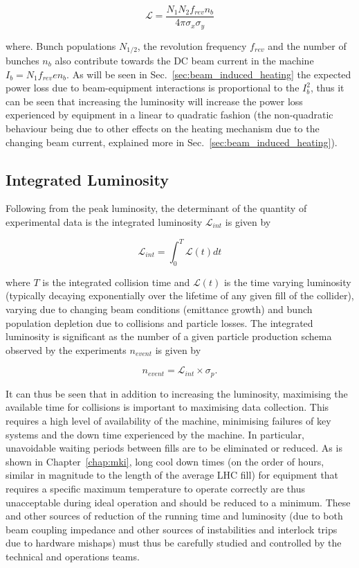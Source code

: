 \begin{equation}
\mathcal{L} = \frac{N_{1} N_{2} f_{rev} n_{b}}{4 \pi \sigma_{x} \sigma_{y}}
\label{eqn:LumiBeamPara}
\end{equation}

where. Bunch populations $N_{1/2}$, the revolution frequency $f_{rev}$ and the number of bunches $n_{b}$ also contribute towards the DC beam current in the machine $I_{b} = N_{1} f_{rev} e n_{b}$. As will be seen in Sec.~\ref{sec:beam_induced_heating} the expected power loss due to beam-equipment interactions is proportional to the $I_{b}^{2}$, thus it can be seen that increasing the luminosity will increase the power loss experienced by equipment in a linear to quadratic fashion (the non-quadratic behaviour being due to other effects on the heating mechanism due to the changing beam current, explained more in Sec.~\ref{sec:beam_induced_heating}).

\subsection{Integrated Luminosity}

Following from the peak luminosity, the determinant of the quantity of experimental data is the integrated luminosity $\mathcal{L}_{int}$ is given by

\begin{equation}
\mathcal{L}_{int} = \int^{T}_{0} \mathcal{L} \left( t \right) dt
\end{equation}

where $T$ is the integrated collision time and $\mathcal{L} (t)$ is the time varying luminosity (typically decaying exponentially over the lifetime of any given fill of the collider\cite{McCrory:lumiEvo}), varying due to changing beam conditions (emittance growth) and bunch population depletion due to collisions and particle losses. The integrated luminosity is significant as the number of a given particle production schema observed by the experiments $n_{event}$ is given by

\begin{equation}
n_{event} = \mathcal{L}_{int} \times \sigma_{p}.
\end{equation}

It can thus be seen that in addition to increasing the luminosity, maximising the available time for collisions is important to maximising data collection. This requires a high level of availability of the machine, minimising failures of key systems and the down time experienced by the machine. In particular, unavoidable waiting periods between fills are to be eliminated or reduced. As is shown in Chapter~\ref{chap:mki}, long cool down times (on the order of hours, similar in magnitude to the length of the average LHC fill) for equipment that requires a specific maximum temperature to operate correctly are thus unacceptable during ideal operation and should be reduced to a minimum. These and other sources of reduction of the running time and luminosity (due to both beam coupling impedance and other sources of instabilities and interlock trips due to hardware mishaps) must thus be carefully studied and controlled by the technical and operations teams.

